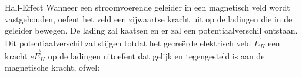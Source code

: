 \begin{theo}{Hall-Effect}
    Wanneer een stroomvoerende geleider in een magnetisch veld wordt vastgehouden,
    oefent het veld een zijwaartse kracht uit op de ladingen die in de geleider bewegen.
    De lading zal kaatsen en er zal een potentiaalverschil ontstaan. Dit potentiaalverschil zal
    stijgen totdat het gecreërde elektrisch veld $\Vec{E}_H$ een kracht $e\Vec{E}_H$ op de ladingen uitoefent dat gelijk en tegengesteld is aan de magnetische kracht, ofwel:
    \begin{minipage}{0.76\textwidth}

        \vspace{0.1cm}


\end{minipage}
\end{theo}
